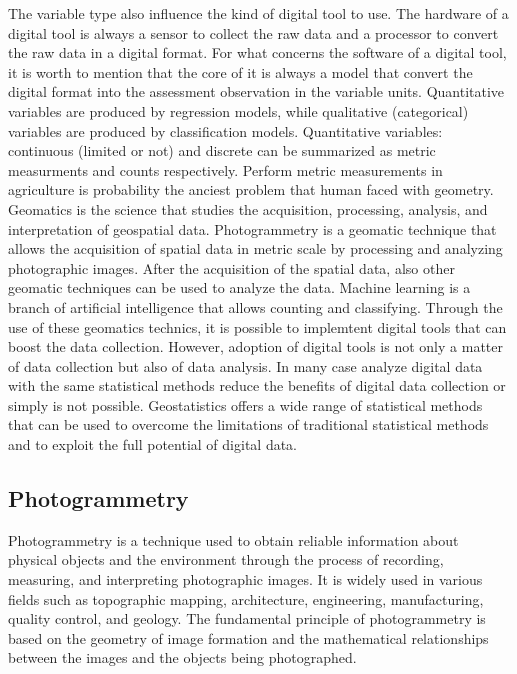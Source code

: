 \documentclass[12pt,a4paper,oneside]{report}
\begin{document}
The variable type also influence the kind of digital tool to use.
The hardware of a digital tool is always a sensor to collect the raw data and a
processor to convert the raw data in a digital format.
For what concerns the software of a digital tool, it is worth to mention that
the core of it is always a model that convert the digital format into the assessment
observation in the variable units.
Quantitative variables are produced by regression models, while qualitative (categorical) 
variables are produced by classification models. 
Quantitative variables: continuous (limited or not) and discrete
can be summarized as metric measurments and counts respectively. 
Perform metric measurements in agriculture is probability the anciest
problem that human faced with geometry. Geomatics is the science that
studies the acquisition, processing, analysis, and interpretation of
geospatial data.
Photogrammetry is a geomatic technique that allows the acquisition of spatial
data in metric scale by processing and analyzing photographic images.
After the acquisition of the spatial data, also other geomatic techniques can be
used to analyze the data. Machine learning is a branch of artificial intelligence
that allows counting and classifying.
Through the use of these geomatics technics, it is possible to implemtent 
digital tools that can boost the data collection.
However, adoption of digital tools is not only a matter of data collection but also of data
analysis. In many case analyze digital data with the same statistical methods
reduce the benefits of digital data collection or simply is not possible. 
Geostatistics offers a wide range of statistical methods that can be used to
overcome the limitations of traditional statistical methods and to exploit the
full potential of digital data.

\subsection{Photogrammetry}

Photogrammetry is a technique used to obtain reliable information about physical 
objects and the environment through the process of recording, measuring, and interpreting 
photographic images. It is widely used in various fields such as topographic mapping, 
architecture, engineering, manufacturing, quality control, and geology. The fundamental 
principle of photogrammetry is based on the geometry of image formation and the 
mathematical relationships between the images and the objects being photographed.
\end{document}

